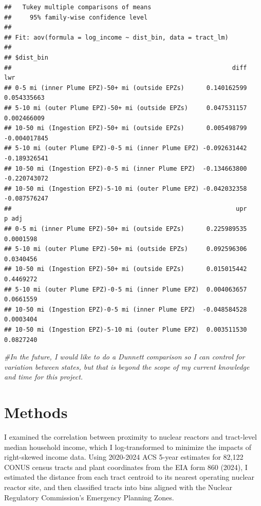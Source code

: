 \documentclass[
]{article}
\newenvironment{Shaded}{\begin{snugshade}}{\end{snugshade}}
\newcommand{\CommentTok}[1]{\textcolor[rgb]{0.56,0.35,0.01}{\textit{#1}}}
\begin{document}
\begin{verbatim}
##   Tukey multiple comparisons of means
##     95% family-wise confidence level
## 
## Fit: aov(formula = log_income ~ dist_bin, data = tract_lm)
## 
## $dist_bin
##                                                            diff          lwr
## 0-5 mi (inner Plume EPZ)-50+ mi (outside EPZs)      0.140162599  0.054335663
## 5-10 mi (outer Plume EPZ)-50+ mi (outside EPZs)     0.047531157  0.002466009
## 10-50 mi (Ingestion EPZ)-50+ mi (outside EPZs)      0.005498799 -0.004017845
## 5-10 mi (outer Plume EPZ)-0-5 mi (inner Plume EPZ) -0.092631442 -0.189326541
## 10-50 mi (Ingestion EPZ)-0-5 mi (inner Plume EPZ)  -0.134663800 -0.220743072
## 10-50 mi (Ingestion EPZ)-5-10 mi (outer Plume EPZ) -0.042032358 -0.087576247
##                                                             upr     p adj
## 0-5 mi (inner Plume EPZ)-50+ mi (outside EPZs)      0.225989535 0.0001598
## 5-10 mi (outer Plume EPZ)-50+ mi (outside EPZs)     0.092596306 0.0340456
## 10-50 mi (Ingestion EPZ)-50+ mi (outside EPZs)      0.015015442 0.4469272
## 5-10 mi (outer Plume EPZ)-0-5 mi (inner Plume EPZ)  0.004063657 0.0661559
## 10-50 mi (Ingestion EPZ)-0-5 mi (inner Plume EPZ)  -0.048584528 0.0003404
## 10-50 mi (Ingestion EPZ)-5-10 mi (outer Plume EPZ)  0.003511530 0.0827240
\end{verbatim}

\begin{Shaded}
\begin{Highlighting}[]
\CommentTok{\#In the future, I would like to do a Dunnett comparison so I can control for variation between states, but that is beyond the scope of my current knowledge and time for this project. }
\end{Highlighting}
\end{Shaded}

\section{Methods}\label{methods}

I examined the correlation between proximity to nuclear reactors and
tract-level median household income, which I log-transformed to minimize
the impacts of right-skewed income data. Using 2020-2024 ACS 5-year
estimates for 82,122 CONUS census tracts and plant coordinates from the
EIA form 860 (2024), I estimated the distance from each tract centroid
to its nearest operating nuclear reactor site, and then classified
tracts into bins aligned with the Nuclear Regulatory Commission's
Emergency Planning Zones.
\end{document}
